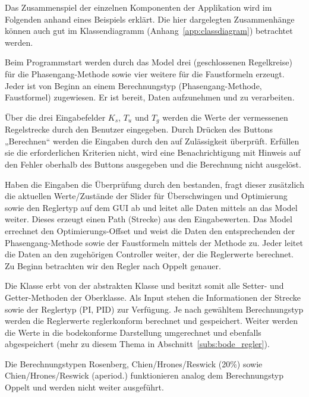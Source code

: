 Das Zusammenspiel der einzelnen Komponenten  der Applikation wird im Folgenden
anhand  eines   Beispiels  erkl\"art. Die  hier   dargelegten  Zusammenh\"ange
k\"onnen   auch   gut   im   Klassendiagramm   (Anhang~\ref{app:classdiagram})
betrachtet werden.

Beim   Programmstart   werden   durch  das   Model   drei   
(geschlossenen Regelkreise)  f\"ur die  Phasengang-Methode sowie  vier weitere
f\"ur  die Faustformeln  erzeugt. Jeder   ist von  Beginn an
einem  Berechnungstyp  (Phasengang-Methode,  Faustformel)  zugewiesen. Er  ist
bereit, Daten aufzunehmen und zu verarbeiten.

\"Uber die  drei Eingabefelder  $K_s$, $T_u$  und $T_g$  werden die  Werte der
vermessenen Regelstrecke  durch den  Benutzer eingegeben. Durch  Dr\"ucken des
Buttons  „Berechnen“ werden  die Eingaben  durch den   auf
Zul\"assigkeit  \"uberpr\"uft. Erf\"ullen  sie  die  erforderlichen  Kriterien
nicht,  wird eine  Benachrichtigung mit  Hinweis auf  den Fehler  oberhalb des
Buttons ausgegeben und die Berechnung nicht ausgel\"ost.

Haben  die   Eingaben  die  \"Uberpr\"ufung  durch   den  
bestanden, fragt dieser zus\"atzlich die aktuellen Werte/Zust\"ande der Slider
f\"ur \"Uberschwingen und  Optimierung sowie den Reglertyp auf dem  GUI ab und
leitet  alle  Daten  mittels    an  das  Model  weiter. Dieses
erzeugt einen  Path (Strecke) aus  den Eingabewerten. Das Model  errechnet den
Optimierungs-Offset und weist die  Daten den entsprechenden 
der  Phasengang-Methode  sowie  der Faustformeln  mittels  der
Methode  zu. Jeder   leitet  die Daten  an den  zugeh\"origen
Controller weiter, der die Reglerwerte berechnet. Zu Beginn betrachten wir den
Regler nach Oppelt genauer.

Die  Klasse   erbt  von der  abstrakten Klasse  
und  besitzt  somit  alle  Setter-  und  Getter-Methoden  der  Oberklasse. Als
Input  stehen die  Informationen der  Strecke  sowie der  Reglertyp (PI,  PID)
zur  Verf\"ugung. Je nach  gew\"ahltem Berechnungstyp  werden die  Reglerwerte
reglerkonform  berechnet  und  gespeichert. Weiter  werden die  Werte  in  die
bodekonforme  Darstellung umgerechnet  und  ebenfalls  abgespeichert (mehr  zu
diesem Thema in Abschnitt~\ref{subs:bode_regler}).

Die    Berechnungstypen   Rosenberg,    Chien/Hrones/Reswick   (20\%)    sowie
Chien/Hrones/Reswick (aperiod.) funktionieren analog dem Berechnungstyp Oppelt
und werden nicht weiter ausgef\"uhrt.

